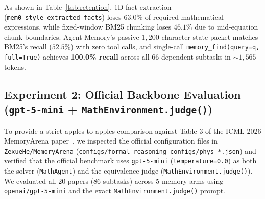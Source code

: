 \documentclass[11pt,a4paper]{article}
\begin{document}
\begin{table}[h]
\centering
\caption{Full-Dataset Symbolic \& Equation Recall across all 20 papers (66 dependent subtasks, $t \ge 2$) on MemoryArena \texttt{formal\_reasoning\_phys}.}
\label{tab:retention}
\end{table}

As shown in Table~\ref{tab:retention}, 1D fact extraction (\texttt{mem0\_style\_extracted\_facts}) loses $63.0\%$ of required mathematical expressions, while fixed-window BM25 chunking loses $46.1\%$ due to mid-equation chunk boundaries. Agent Memory's passive $1{,}200$-character state packet matches BM25's recall ($52.5\%$) with zero tool calls, and single-call \texttt{memory\_find(query=q, full=True)} achieves \textbf{100.0\% recall} across all 66 dependent subtasks in $\sim 1{,}565$ tokens.

\subsection{Experiment 2: Official Backbone Evaluation (\texttt{gpt-5-mini} + \texttt{MathEnvironment.judge()})}

To provide a strict apples-to-apples comparison against Table 3 of the ICML 2026 MemoryArena paper~\cite{he2026memoryarena}, we inspected the official configuration files in \texttt{ZexueHe/MemoryArena} (\texttt{configs/formal\_reasoning\_configs/phys\_*.json}) and verified that the official benchmark uses \texttt{gpt-5-mini} (\texttt{temperature=0.0}) as both the solver (\texttt{MathAgent}) and the equivalence judge (\texttt{MathEnvironment.judge()}). We evaluated all 20 papers (86 subtasks) across 5 memory arms using \texttt{openai/gpt-5-mini} and the exact \texttt{MathEnvironment.judge()} prompt.
\end{document}
